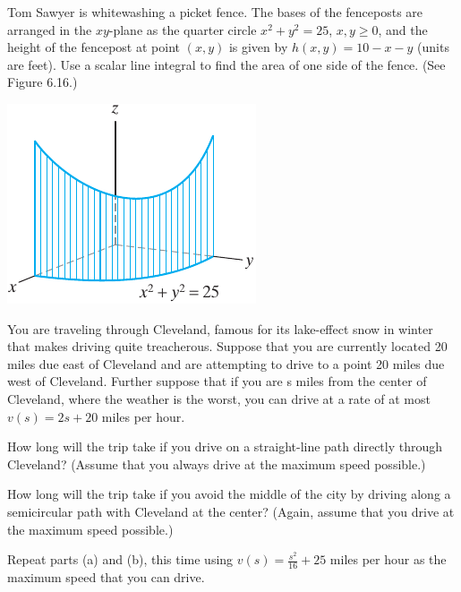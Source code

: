 \documentclass[boxes]{gsypset}
\begin{document}
	\begin{problem}[6.1.34]
		Tom Sawyer is whitewashing a picket fence. 
		The bases of the fenceposts are arranged in the $xy$-plane as the quarter circle
		$x^2 + y^2 = 25$, $x,y \geq 0$, and the height of the fencepost at point $(x,y)$ is given by 
		$h(x,y) = 10 - x - y$ (units are feet). 
		Use a scalar line integral to find the area of one side of the fence. (See Figure 6.16.)
		
		\begin{center}
			\includegraphics{img/6_1_34}
			\renewcommand{\thefigure}{6.16}
		\end{center}
	\end{problem}
	\begin{solution}
		
	\end{solution}
	
	\begin{problem}[6.1.40]
		You are traveling through Cleveland, 
		famous for its lake-effect snow in winter that makes driving quite treacherous. 
		Suppose that you are currently located 20 miles due east of Cleveland and 
		are attempting to drive to a point 20 miles due west of Cleveland. 
		Further suppose that if you are s miles from the center of Cleveland, 
		where the weather is the worst, you can drive at a rate of at most 
		$v(s) = 2s + 20$ miles per hour.
		\begin{subproblems}
			\subproblem
				How long will the trip take if you drive on a straight-line path directly through Cleveland?
				(Assume that you always drive at the maximum speed possible.)
				\begin{solution}
					
				\end{solution}
			\subproblem
				How long will the trip take if you avoid the middle of the city by driving along a
				semicircular path with Cleveland at the center? 
				(Again, assume that you drive at the maximum speed possible.)
				\begin{solution}
					
				\end{solution}
			\subproblem
				Repeat parts (a) and (b), this time using $v(s) = \frac{s^2}{16} + 25$ miles per hour 
				as the maximum speed that you can drive.
				\begin{solution}
					
				\end{solution}
		\end{subproblems}
	\end{problem}
\end{document}
